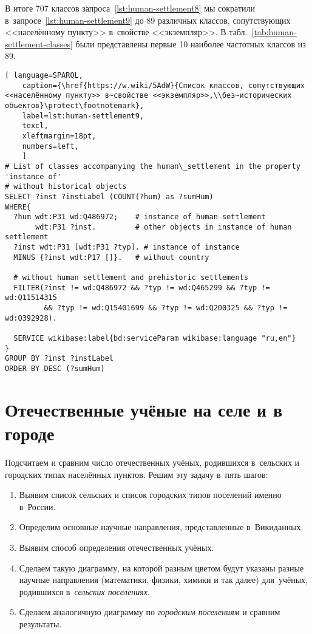 В итоге 707 классов запроса~\ref{lst:human-settlement8} 
мы сократили в~запросе~\ref{lst:human-settlement9} 
до 89 различных классов, сопутствующих <<населённому пункту>> в~свойстве <<экземпляр>>. 
В табл.~\ref{tab:human-settlement-classes} были представлены 
первые 10 наиболее частотных классов из 89. 



\newpage
\lstset{numbers=left, firstnumber=1, frame=single}
\begin{lstlisting}[ language=SPARQL, 
    caption={\href{https://w.wiki/5AdW}{Cписок классов, сопутствующих <<населённому пункту>> в~свойстве <<экземпляр>>,\\без~исторических объектов}\protect\footnotemark},
    label=lst:human-settlement9,
    texcl,
    xleftmargin=18pt, 
    numbers=left,
    ]
# List of classes accompanying the human\_settlement in the property 'instance of' 
# without historical objects 
SELECT ?inst ?instLabel (COUNT(?hum) as ?sumHum)
WHERE{
  ?hum wdt:P31 wd:Q486972;    # instance of human settlement
       wdt:P31 ?inst.         # other objects in instance of human settlement
  ?inst wdt:P31 [wdt:P31 ?typ]. # instance of instance
  MINUS {?inst wdt:P17 []}.   # without country

  # without human settlement and prehistoric settlements
  FILTER(?inst != wd:Q486972 && ?typ != wd:Q465299 && ?typ != wd:Q11514315 
         && ?typ != wd:Q15401699 && ?typ != wd:Q200325 && ?typ != wd:Q392928). 

  SERVICE wikibase:label{bd:serviceParam wikibase:language "ru,en"}
}
GROUP BY ?inst ?instLabel
ORDER BY DESC (?sumHum)
\end{lstlisting}%




\section{Отечественные учёные на селе и в городе}

Подсчитаем и сравним число отечественных учёных, родившихся в~сельских и городских типах населённых пунктов. 
Решим эту задачу в~пять шагов:
\begin{enumerate}
  \item Выявим список сельских и список городских типов поселений именно в~России.
  \item Определим основные научные направления, представленные в~Викиданных.
  \item Выявим способ определения отечественных учёных.
  \item Сделаем такую диаграмму, на которой разным цветом будут указаны разные научные направления (математики, физики, химики и так далее) для~учёных, родившихся в~\emph{сельских поселениях}.
  \item Сделаем аналогичную диаграмму по \emph{городским поселениям} и сравним результаты.
\end{enumerate}




